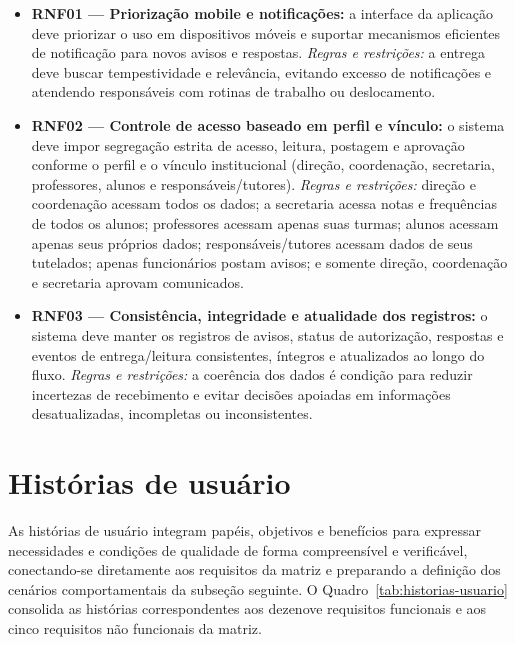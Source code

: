 \documentclass[a4paper,12pt]{report}
\begin{document}
\begin{itemize}
    \item \textbf{RNF01 — Priorização mobile e notificações:} a interface da aplicação deve priorizar o uso em dispositivos móveis e suportar mecanismos eficientes de notificação para novos avisos e respostas. \textit{Regras e restrições:} a entrega deve buscar tempestividade e relevância, evitando excesso de notificações e atendendo responsáveis com rotinas de trabalho ou deslocamento.
    
    \item \textbf{RNF02 — Controle de acesso baseado em perfil e vínculo:} o sistema deve impor segregação estrita de acesso, leitura, postagem e aprovação conforme o perfil e o vínculo institucional (direção, coordenação, secretaria, professores, alunos e responsáveis/tutores). \textit{Regras e restrições:} direção e coordenação acessam todos os dados; a secretaria acessa notas e frequências de todos os alunos; professores acessam apenas suas turmas; alunos acessam apenas seus próprios dados; responsáveis/tutores acessam dados de seus tutelados; apenas funcionários postam avisos; e somente direção, coordenação e secretaria aprovam comunicados.
    
    \item \textbf{RNF03 — Consistência, integridade e atualidade dos registros:} o sistema deve manter os registros de avisos, status de autorização, respostas e eventos de entrega/leitura consistentes, íntegros e atualizados ao longo do fluxo. \textit{Regras e restrições:} a coerência dos dados é condição para reduzir incertezas de recebimento e evitar decisões apoiadas em informações desatualizadas, incompletas ou inconsistentes.
\end{itemize}

\section{Histórias de usuário}

As histórias de usuário integram papéis, objetivos e benefícios para expressar necessidades e condições de qualidade de forma compreensível e verificável, conectando-se diretamente aos requisitos da matriz e preparando a definição dos cenários comportamentais da subseção seguinte. O Quadro~\ref{tab:historias-usuario} consolida as histórias correspondentes aos dezenove requisitos funcionais e aos cinco requisitos não funcionais da matriz.
\end{document}
